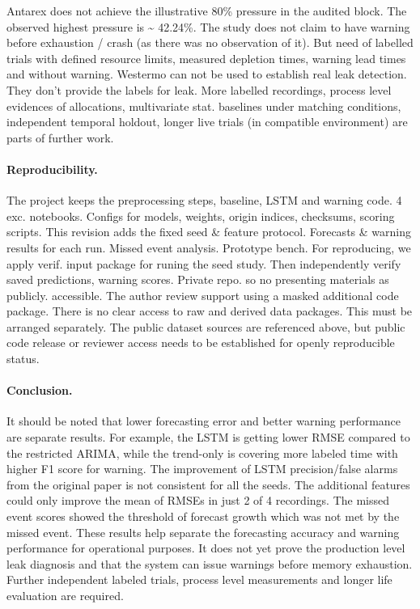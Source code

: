 \documentclass{llncs}
\begin{document}
Antarex does not achieve the illustrative 80\% pressure in the audited block. The observed highest pressure is \textasciitilde{} 42.24\%. The study does not claim to have warning before exhaustion / crash (as there was no observation of it). But need of labelled trials with defined resource limits, measured depletion times, warning lead times and without warning. Westermo can not be used to establish real leak detection. They don't provide the labels for leak. More labelled recordings, process level evidences of allocations, multivariate stat. baselines under matching conditions, independent temporal holdout, longer live trials (in compatible environment) are parts of further work.

\paragraph{Reproducibility.} The project keeps the preprocessing steps, baseline, LSTM and warning code. 4 exc. notebooks. Configs for models, weights, origin indices, checksums, scoring scripts. This revision adds the fixed seed \& feature protocol. Forecasts \& warning results for each run. Missed event analysis. Prototype bench. For reproducing, we apply verif. input package for runing the seed study. Then independently verify saved predictions, warning scores. Private repo. so no presenting materials as publicly.
accessible. The author review support using a masked additional code package. There is no clear access to raw and derived data packages. This must be arranged separately. The public dataset sources are referenced above, but public code release or reviewer access needs to be established for \textquotedbl{}openly reproducible\textquotedbl{} status.

\begin{samepage}
\paragraph{Conclusion.} It should be noted that lower forecasting error and better warning performance are separate results. For example, the LSTM is getting lower RMSE compared to the restricted ARIMA, while the trend-only is covering more labeled time with higher F1 score for warning. The improvement of LSTM precision/false alarms from the original paper is not consistent for all the seeds. The additional features could only improve the mean of RMSEs in just 2 of 4 recordings. The missed event scores showed the threshold of forecast growth which was not met by the missed event. These results help separate the forecasting accuracy and warning performance for operational purposes. It does not yet prove the production level leak diagnosis and that the system can issue warnings before memory exhaustion. Further independent labeled trials, process level measurements and longer life evaluation are required.
\par\end{samepage}



\end{document}
